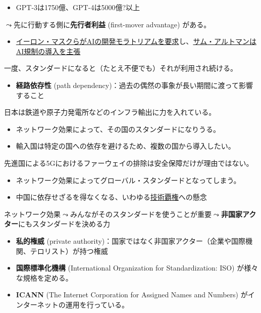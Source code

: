 \documentclass[
  xelatex,
  ja=standard]{bxjsarticle}
\providecommand{\tightlist}{%
  \setlength{\itemsep}{0pt}\setlength{\parskip}{0pt}}\usepackage{longtable,booktabs,array}
\begin{document}
\begin{itemize}
\tightlist
\item
  GPT-3は1750億、GPT-4は5000億?以上
\end{itemize}

\(\leadsto\)先に行動する側に\textbf{先行者利益} (first-mover advantage)
がある。

\begin{itemize}
\tightlist
\item
  \href{https://jp.reuters.com/article/elon-musk-ai-idJPKBN2VV0CW}{イーロン・マスクらがAIの開発モラトリアムを要求}し、\href{https://www.bloomberg.co.jp/news/articles/2023-05-16/RUREP2T0G1KW01}{サム・アルトマンはAI規制の導入を主張}
\end{itemize}

一度、スタンダードになると（たとえ不便でも）それが利用され続ける。

\begin{itemize}
\tightlist
\item
  \textbf{経路依存性} (path
  dependency)：過去の偶然の事象が長い期間に渡って影響すること
\end{itemize}

日本は鉄道や原子力発電所などのインフラ輸出に力を入れている。

\begin{itemize}
\tightlist
\item
  ネットワーク効果によって、その国のスタンダードになりうる。
\item
  輸入国は特定の国への依存を避けるため、複数の国から導入したい。
\end{itemize}

先進国による5Gにおけるファーウェイの排除は安全保障だけが理由ではない。

\begin{itemize}
\tightlist
\item
  ネットワーク効果によってグローバル・スタンダードとなってしまう。
\item
  中国に依存せざるを得なくなる、いわゆる\href{https://www.jiia.or.jp/column/post-30.html}{技術覇権}への懸念
\end{itemize}

ネットワーク効果\(\leadsto\)みんながそのスタンダードを使うことが重要\(\leadsto\)\textbf{非国家アクター}にもスタンダードを決める力

\begin{itemize}
\tightlist
\item
  \textbf{私的権威} (private
  authority)：国家ではなく非国家アクター（企業や国際機関、テロリスト）が持つ権威\citep{hall2002}
\item
  \textbf{国際標準化機構} (International Organization for
  Standardization: ISO) が様々な規格を定める。
\item
  \textbf{ICANN} (The Internet Corporation for Assigned Names and
  Numbers) がインターネットの運用を行っている。
\end{itemize}
\end{document}
